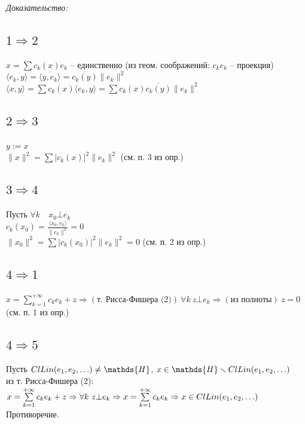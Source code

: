 \documentclass[paper=a4, fontsize=17pt]{article}
\begin{document}
\emph{Доказательство:}

\subsection{\texorpdfstring{$1 \Rightarrow 2$}{TEXT}}
$x=\sum c_k(x) e_k$ -- единственно (из геом. соображений: $c_k e_k$ -- проекция)\\
$\langle e_k, y \rangle = \overline{\langle y, e_k \rangle} = \overline{c_k(y)}\|e_k\|^2$\\
$\langle x, y \rangle = \sum c_k(x) \langle e_k, y \rangle = \sum c_k(x)\overline{c_k(y)}\|e_k\|^2$

\subsection{\texorpdfstring{$2 \Rightarrow 3$}{TEXT}}
$y:=x$\\
$\|x\|^2=\sum \vert c_k(x) \vert ^2 \|e_k\|^2$ (см. п. 3 из опр.)

\subsection{\texorpdfstring{$3 \Rightarrow 4$}{TEXT}}
Пусть $\forall k \quad x_0 \bot e_k$\\
$c_k(x_0)=\frac{\langle x_0, e_k \rangle}{\|e_k\|^2}=0$\\
$\|x_0\|^2=\sum \vert c_k(x_0) \vert^2 \|e_k\|^2 = 0$ (см. п. 2 из опр.)

\subsection{\texorpdfstring{$4 \Rightarrow 1$}{TEXT}}
$x =\sum\limits_{k=1}^{+\infty} c_k e_k + z \Rightarrow(\text{т. Рисса-Фишера (2)}) \  \forall k \ z \bot e_k \Rightarrow(\text{из полноты}) \ z = 0$ (см. п. 1 из опр.)

\subsection{\texorpdfstring{$4 \Rightarrow 5$}{TEXT}}
Пусть $Cl Lin(e_1, e_2, \mathellipsis) \ne \mathds{H}$, $x \in \mathds{H} \smallsetminus Cl Lin(e_1, e_2, \mathellipsis)$\\
из т. Рисса-Фишера (2): $x =\sum\limits_{k=1}^{+\infty} c_k e_k + z \Rightarrow \forall k \ z \bot e_k \Rightarrow x =\sum\limits_{k=1}^{+\infty} c_k e_k \Rightarrow x \in Cl Lin(e_1, e_2, \mathellipsis)$\\
Противоречие.
\end{document}
